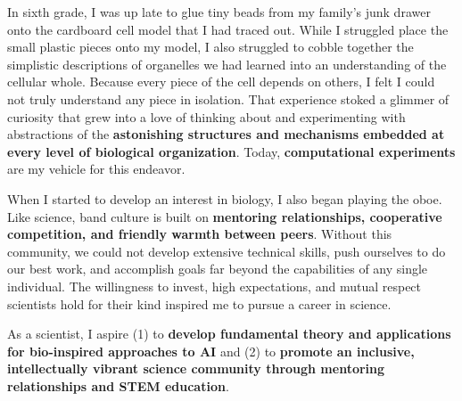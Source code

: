 In sixth grade, I was up late to glue tiny beads from my family's junk drawer onto the cardboard cell model that I had traced out.
While I struggled place the small plastic pieces onto my model, I also struggled to cobble together the simplistic descriptions of organelles we had learned into an understanding of the cellular whole.
Because every piece of the cell depends on others, I felt I could not truly understand any piece in isolation.
That experience stoked a glimmer of curiosity that grew into a love of thinking about and experimenting with abstractions of the \textbf{astonishing structures and mechanisms embedded at every level of biological organization}.
Today, \textbf{computational experiments} are my vehicle for this endeavor.

When I started to develop an interest in biology, I also began playing the oboe.
Like science, band culture is built on \textbf{mentoring relationships, cooperative competition, and friendly warmth between peers}.
Without this community, we could not develop extensive technical skills, push ourselves to do our best work, and accomplish goals far beyond the capabilities of any single individual.
The willingness to invest, high expectations, and mutual respect scientists hold for their kind inspired me to pursue a career in science.

As a scientist, I aspire
(1) to \textbf{develop fundamental theory and applications for bio-inspired approaches to AI} and
(2) to \textbf{promote an inclusive, intellectually vibrant science community through mentoring relationships and STEM education}.
